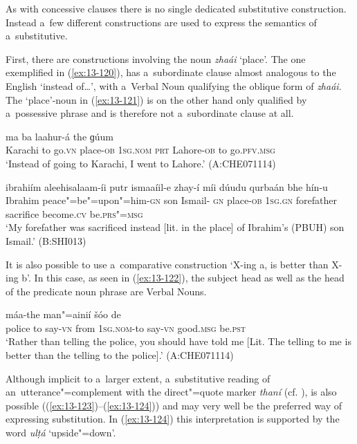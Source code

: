  As with concessive clauses there is no single dedicated substitutive construction. Instead a~few different constructions are used to express the semantics of a~substitutive.


First, there are constructions involving the noun \textit{zhaái} `place'. The one exemplified in (\ref{ex:13-120}), has a~subordinate clause almost analogous to the English `instead of{\ldots}', with a~Verbal Noun qualifying the oblique form of \textit{zhaái}. The `place'-noun in (\ref{ex:13-121}) is on the other hand only qualified by a~possessive phrase and is therefore not a~subordinate clause at all. 

\begin{exe}
\ex
\label{ex:13-120}
 ma ba laahur-á  the ɡúum \\
Karachi to go.\textsc{vn} place-\textsc{ob} \textsc{1sg.nom} \textsc{prt} Lahore-\textsc{ob} to go.\textsc{pfv.msg} \\
\glt `Instead of going to Karachi, I went to Lahore.' (A:CHE071114)

\ex
\label{ex:13-121}
\gll ibrahiím aleehisalaam-íi putr ismaaíil-e zhay-í  míi dúudu qurbaán bhe hín-u \\
Ibrahim peace"=be"=upon"=him-\textsc{gn} son Ismail-\textsc{ gn} place-\textsc{ob}  \textsc{1sg.gn} forefather sacrifice become.\textsc{cv} be.\textsc{prs"=msg} \\
\glt `My forefather was sacrificed instead [lit. in the place] of Ibrahim's (PBUH) son Ismail.' (B:SHI013) 
\end{exe}

It is also possible to use a~comparative construction `X-ing a, is better than X-ing b'. In this case, as seen in (\ref{ex:13-122}), the subject head as well as the head of the predicate noun phrase are Verbal Nouns.

\begin{exe}
\ex
\label{ex:13-122}
\gll [pulusá the man"=ainií díi] máa-the man"=ainií šóo de \\
police to say-\textsc{vn} from \textsc{1sg.nom-}to say-\textsc{vn} good.\textsc{msg} be.\textsc{pst} \\
\glt `Rather than telling the police, you should have told me [Lit. The telling to me is better than the telling to the police].' (A:CHE071114) 
\end{exe}

Although implicit to a~larger extent, a~substitutive reading of an~utterance"=complement with the direct"=quote marker \textit{thaní} (cf. ), is also possible ((\ref{ex:13-123})--(\ref{ex:13-124})) and may very well be the preferred way of expressing substitution. In (\ref{ex:13-124}) this interpretation is supported by the word \textit{ulṭá} `upside"=down'.

